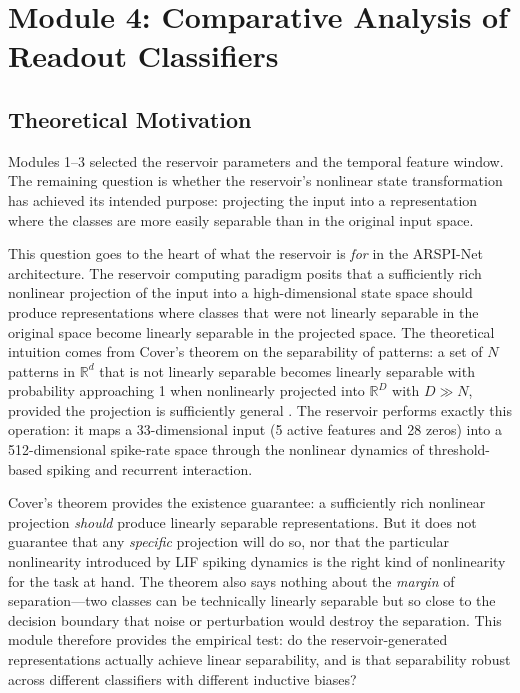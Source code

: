 \section{Module 4: Comparative Analysis of Readout Classifiers}
\label{sec:module4}

\subsection{Theoretical Motivation}

Modules 1--3 selected the reservoir parameters and the temporal feature window. The remaining question is whether the reservoir's nonlinear state transformation has achieved its intended purpose: projecting the input into a representation where the classes are more easily separable than in the original input space.

This question goes to the heart of what the reservoir is \emph{for} in the ARSPI-Net architecture. The reservoir computing paradigm posits that a sufficiently rich nonlinear projection of the input into a high-dimensional state space should produce representations where classes that were not linearly separable in the original space become linearly separable in the projected space. The theoretical intuition comes from Cover's theorem on the separability of patterns: a set of $N$ patterns in $\mathbb{R}^d$ that is not linearly separable becomes linearly separable with probability approaching 1 when nonlinearly projected into $\mathbb{R}^D$ with $D \gg N$, provided the projection is sufficiently general \cite{Cover1965}. The reservoir performs exactly this operation: it maps a 33-dimensional input (5 active features and 28 zeros) into a 512-dimensional spike-rate space through the nonlinear dynamics of threshold-based spiking and recurrent interaction.

Cover's theorem provides the existence guarantee: a sufficiently rich nonlinear projection \emph{should} produce linearly separable representations. But it does not guarantee that any \emph{specific} projection will do so, nor that the particular nonlinearity introduced by LIF spiking dynamics is the right kind of nonlinearity for the task at hand. The theorem also says nothing about the \emph{margin} of separation---two classes can be technically linearly separable but so close to the decision boundary that noise or perturbation would destroy the separation. This module therefore provides the empirical test: do the reservoir-generated representations actually achieve linear separability, and is that separability robust across different classifiers with different inductive biases?

